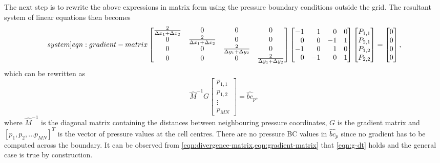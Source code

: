\documentclass{article}
\begin{document}
The next step is to rewrite the above expressions in matrix form using the pressure boundary conditions outside the grid. The resultant system of linear equations then becomes
\begin{equation}\label[system]{eqn:gradient-matrix}
	\begin{bmatrix}{}
		\frac{2}{\Delta x_1 + \Delta x_2}	&0	&0	&0	\\
		0	&\frac{2}{\Delta x_1 + \Delta x_2}	&0	&0	\\
		0	&0	&\frac{2}{\Delta y_1 + \Delta y_2}	&0	\\
		0	&0	&0	&\frac{2}{\Delta y_1 + \Delta y_2}\\
	\end{bmatrix}
	\begin{bmatrix*}[r]
	-1 & 1 & 0 & 0 \\
	0 & 0 & -1 & 1 \\
	-1 & 0 & 1 & 0 \\
	0 & -1 & 0 & 1
	\end{bmatrix*}
	\begin{bmatrix}{}
  		P_{1,1} \\
	  	P_{2,1} \\
		P_{1,2} \\
		P_{2,2}
	\end{bmatrix}
	=
	\begin{bmatrix}{}
		0\\
		0\\
		0\\
		0
	\end{bmatrix},
\end{equation}
which can be rewritten as
\begin{equation}
	\hat{M}^{-1}{G} 
	\begin{bmatrix}{}
  		p_{1,1} \\
	  	p_{1,2} \\
	  	\vdots \\
	  	p_{MN}
	\end{bmatrix}
=\hat{bc}_p,
\end{equation}
where $\hat{M}^{-1}$ is the diagonal matrix containing the distances between neighbouring pressure coordinates, ${G}$ is the gradient matrix and $[p_1,p_2,...p_{MN}]^T$ is the vector of pressure values at the cell centres. There are no pressure BC values in $\hat{bc}_p$ since no gradient has to be computed across the boundary. It can be observed from \cref{eqn:divergence-matrix,eqn:gradient-matrix} that \cref{eqn:g-dt} holds and the general case is true by construction.
\end{document}
